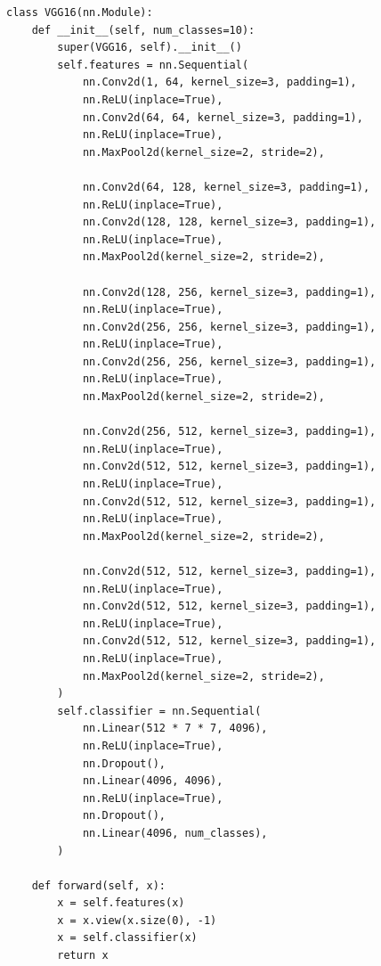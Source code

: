 \documentclass{article}
\begin{document}
\begin{lstlisting}
class VGG16(nn.Module):
    def __init__(self, num_classes=10):
        super(VGG16, self).__init__()
        self.features = nn.Sequential(
            nn.Conv2d(1, 64, kernel_size=3, padding=1),
            nn.ReLU(inplace=True),
            nn.Conv2d(64, 64, kernel_size=3, padding=1),
            nn.ReLU(inplace=True),
            nn.MaxPool2d(kernel_size=2, stride=2),

            nn.Conv2d(64, 128, kernel_size=3, padding=1),
            nn.ReLU(inplace=True),
            nn.Conv2d(128, 128, kernel_size=3, padding=1),
            nn.ReLU(inplace=True),
            nn.MaxPool2d(kernel_size=2, stride=2),

            nn.Conv2d(128, 256, kernel_size=3, padding=1),
            nn.ReLU(inplace=True),
            nn.Conv2d(256, 256, kernel_size=3, padding=1),
            nn.ReLU(inplace=True),
            nn.Conv2d(256, 256, kernel_size=3, padding=1),
            nn.ReLU(inplace=True),
            nn.MaxPool2d(kernel_size=2, stride=2),

            nn.Conv2d(256, 512, kernel_size=3, padding=1),
            nn.ReLU(inplace=True),
            nn.Conv2d(512, 512, kernel_size=3, padding=1),
            nn.ReLU(inplace=True),
            nn.Conv2d(512, 512, kernel_size=3, padding=1),
            nn.ReLU(inplace=True),
            nn.MaxPool2d(kernel_size=2, stride=2),

            nn.Conv2d(512, 512, kernel_size=3, padding=1),
            nn.ReLU(inplace=True),
            nn.Conv2d(512, 512, kernel_size=3, padding=1),
            nn.ReLU(inplace=True),
            nn.Conv2d(512, 512, kernel_size=3, padding=1),
            nn.ReLU(inplace=True),
            nn.MaxPool2d(kernel_size=2, stride=2),
        )
        self.classifier = nn.Sequential(
            nn.Linear(512 * 7 * 7, 4096),
            nn.ReLU(inplace=True),
            nn.Dropout(),
            nn.Linear(4096, 4096),
            nn.ReLU(inplace=True),
            nn.Dropout(),
            nn.Linear(4096, num_classes),
        )

    def forward(self, x):
        x = self.features(x)
        x = x.view(x.size(0), -1)
        x = self.classifier(x)
        return x
\end{lstlisting}
\end{document}
